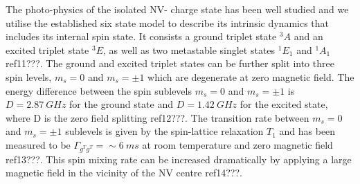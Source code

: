 \documentclass[preprint,prl]{revtex4}
\begin{document}
The photo-physics of the isolated NV- charge state has been well studied and we utilise the established six state model to describe its intrinsic dynamics that includes its internal spin state. It consists a ground triplet state $^3A$ and an excited triplet state $^3E$, as well as two metastable singlet states $^1E_1$ and $^1A_1$ ref11???. The ground and excited triplet states can be further split into three spin levels, $m_s=0$ and $m_s=\pm1$ which are degenerate at zero magnetic field. The energy difference between the spin sublevels $m_s=0$ and $m_s=\pm1$ is $D=\SI{2.87}{GHz}$ for the ground state and $D=\SI{1.42}{GHz}$ for the excited state, where D is the zero field splitting ref12???. The transition rate between $m_s=0$ and $m_s=\pm1$ sublevels is given by the spin-lattice relaxation $T_1$ and has been measured to be $\Gamma_{g^Tg^T} = \sim\SI{6}{ms}$ at room temperature and zero magnetic field ref13???. This spin mixing rate can be increased dramatically by applying a large magnetic field in the vicinity of the NV centre ref14???.
\end{document}

